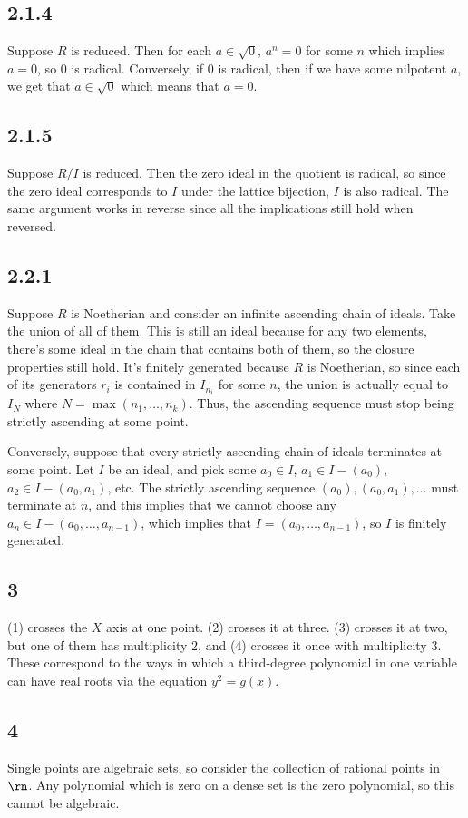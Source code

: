 \documentclass{article}
\begin{document}
\subsection*{2.1.4}
Suppose $R$ is reduced. Then for each $a\in\sqrt{0}$, $a^n=0$ for some $n$ which implies $a=0$, so $0$ is radical. Conversely, if $0$ is radical, then if we have some nilpotent $a$, we get that $a\in\sqrt{0}$ which means that $a=0$.
\subsection*{2.1.5}
Suppose $R/I$ is reduced. Then the zero ideal in the quotient is radical, so since the zero ideal corresponds to $I$ under the lattice bijection, $I$ is also radical. The same argument works in reverse since all the implications still hold when reversed.
\subsection*{2.2.1}
Suppose $R$ is Noetherian and consider an infinite ascending chain of ideals. Take the union of all of them. This is still an ideal because for any two elements, there's some ideal in the chain that contains both of them, so the closure properties still hold. It's finitely generated because $R$ is Noetherian, so since each of its generators $r_i$ is contained in $I_{n_i}$ for some $n$, the union is actually equal to $I_N$ where $N=\max(n_1,\ldots,n_k)$. Thus, the ascending sequence must stop being strictly ascending at some point.

Conversely, suppose that every strictly ascending chain of ideals terminates at some point. Let $I$ be an ideal, and pick some $a_0\in I$, $a_1\in I-(a_0)$, $a_2\in I-(a_0,a_1)$, etc. The strictly ascending sequence $(a_0),(a_0,a_1),\ldots$ must terminate at $n$, and this implies that we cannot choose any $a_n\in I-(a_0,\ldots,a_{n-1})$, which implies that $I=(a_0,\ldots,a_{n-1})$, so $I$ is finitely generated.
\subsection*{3}
(1) crosses the $X$ axis at one point. (2) crosses it at three. (3) crosses it at two, but one of them has multiplicity $2$, and (4) crosses it once with multiplicity $3$. These correspond to the ways in which a third-degree polynomial in one variable can have real roots via the equation $y^2=g(x)$.
\subsection*{4}
Single points are algebraic sets, so consider the collection of rational points in $\rn$. Any polynomial which is zero on a dense set is the zero polynomial, so this cannot be algebraic.
\end{document}
